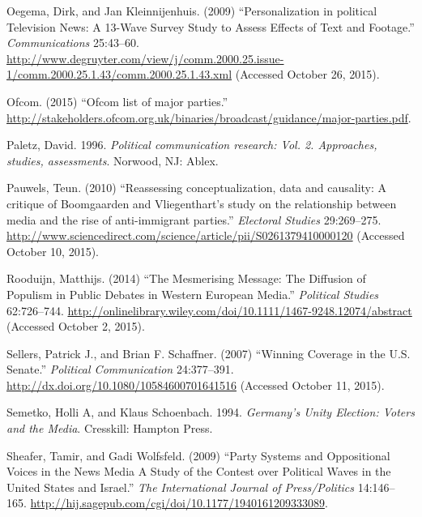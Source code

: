 \documentclass[12pt,article]{article}
\begin{document}
Oegema, Dirk, and Jan Kleinnijenhuis. (2009) ``Personalization in
political Television News: A 13-Wave Survey Study to Assess Effects of
Text and Footage.'' \emph{Communications} 25:43--60.
\url{http://www.degruyter.com/view/j/comm.2000.25.issue-1/comm.2000.25.1.43/comm.2000.25.1.43.xml}
(Accessed October 26, 2015).

Ofcom. (2015) ``Ofcom list of major parties.''
\url{http://stakeholders.ofcom.org.uk/binaries/broadcast/guidance/major-parties.pdf}.

Paletz, David. 1996. \emph{Political communication research: Vol. 2.
Approaches, studies, assessments}. Norwood, NJ: Ablex.

Pauwels, Teun. (2010) ``Reassessing conceptualization, data and
causality: A critique of Boomgaarden and Vliegenthart's study on the
relationship between media and the rise of anti-immigrant parties.''
\emph{Electoral Studies} 29:269--275.
\url{http://www.sciencedirect.com/science/article/pii/S0261379410000120}
(Accessed October 10, 2015).

Rooduijn, Matthijs. (2014) ``The Mesmerising Message: The Diffusion of
Populism in Public Debates in Western European Media.'' \emph{Political
Studies} 62:726--744.
\url{http://onlinelibrary.wiley.com/doi/10.1111/1467-9248.12074/abstract}
(Accessed October 2, 2015).

Sellers, Patrick J., and Brian F. Schaffner. (2007) ``Winning Coverage
in the U.S. Senate.'' \emph{Political Communication} 24:377--391.
\url{http://dx.doi.org/10.1080/10584600701641516} (Accessed October 11,
2015).

Semetko, Holli A, and Klaus Schoenbach. 1994. \emph{Germany's Unity
Election: Voters and the Media}. Cresskill: Hampton Press.

Sheafer, Tamir, and Gadi Wolfsfeld. (2009) ``Party Systems and
Oppositional Voices in the News Media A Study of the Contest over
Political Waves in the United States and Israel.'' \emph{The
International Journal of Press/Politics} 14:146--165.
\url{http://hij.sagepub.com/cgi/doi/10.1177/1940161209333089}.
\end{document}
